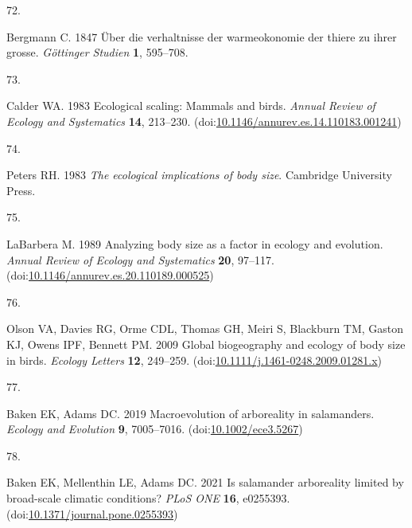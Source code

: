 \documentclass[
  11pt,
]{article}
\newlength{\cslhangindent}
\newlength{\csllabelwidth}
\newlength{\cslentryspacingunit} %
\newenvironment{CSLReferences}[2] %
 {%
  \setlength{\parindent}{0pt}
  \ifodd #1
  \let\oldpar\par
  \def\par{\hangindent=\cslhangindent\oldpar}
  \fi
  \setlength{\parskip}{#2\cslentryspacingunit}
 }%
 {}
\newcommand{\CSLLeftMargin}[1]{\parbox[t]{\csllabelwidth}{#1}}
\newcommand{\CSLRightInline}[1]{\parbox[t]{\linewidth - \csllabelwidth}{#1}\break}
\begin{document}
\begin{CSLReferences}{0}{0}
\leavevmode{}%
\CSLLeftMargin{72. }%
\CSLRightInline{Bergmann C. 1847 {Ü}ber die verhaltnisse der
warmeokonomie der thiere zu ihrer grosse. \emph{G{ö}ttinger Studien}
\textbf{1}, 595--708.}

\leavevmode{}%
\CSLLeftMargin{73. }%
\CSLRightInline{Calder WA. 1983 Ecological scaling: Mammals and birds.
\emph{Annual Review of Ecology and Systematics} \textbf{14}, 213--230.
(doi:\href{https://doi.org/10.1146/annurev.es.14.110183.001241}{10.1146/annurev.es.14.110183.001241})}

\leavevmode{}%
\CSLLeftMargin{74. }%
\CSLRightInline{Peters RH. 1983 \emph{The ecological implications of
body size}. Cambridge University Press. }

\leavevmode{}%
\CSLLeftMargin{75. }%
\CSLRightInline{LaBarbera M. 1989 Analyzing body size as a factor in
ecology and evolution. \emph{Annual Review of Ecology and Systematics}
\textbf{20}, 97--117.
(doi:\href{https://doi.org/10.1146/annurev.es.20.110189.000525}{10.1146/annurev.es.20.110189.000525})}

\leavevmode{}%
\CSLLeftMargin{76. }%
\CSLRightInline{Olson VA, Davies RG, Orme CDL, Thomas GH, Meiri S,
Blackburn TM, Gaston KJ, Owens IPF, Bennett PM. 2009 Global biogeography
and ecology of body size in birds. \emph{Ecology Letters} \textbf{12},
249--259.
(doi:\href{https://doi.org/10.1111/j.1461-0248.2009.01281.x}{10.1111/j.1461-0248.2009.01281.x})}

\leavevmode{}%
\CSLLeftMargin{77. }%
\CSLRightInline{Baken EK, Adams DC. 2019 Macroevolution of arboreality
in salamanders. \emph{Ecology and Evolution} \textbf{9}, 7005--7016.
(doi:\href{https://doi.org/10.1002/ece3.5267}{10.1002/ece3.5267})}

\leavevmode{}%
\CSLLeftMargin{78. }%
\CSLRightInline{Baken EK, Mellenthin LE, Adams DC. 2021 Is salamander
arboreality limited by broad-scale climatic conditions? \emph{PLoS ONE}
\textbf{16}, e0255393.
(doi:\href{https://doi.org/10.1371/journal.pone.0255393}{10.1371/journal.pone.0255393})}

\end{CSLReferences}

\newpage

\hfill\break
\end{document}
